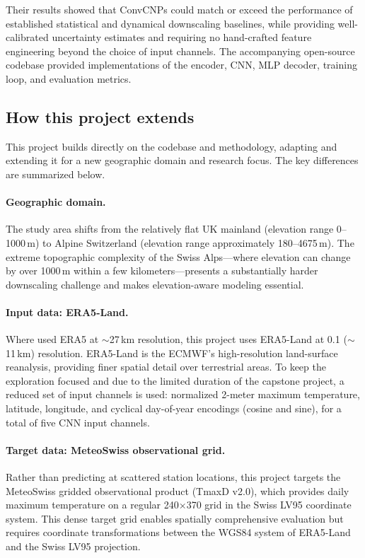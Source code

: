 Their results showed that ConvCNPs could match or exceed the performance of established statistical and dynamical downscaling baselines, while providing well-calibrated uncertainty estimates and requiring no hand-crafted feature engineering beyond the choice of input channels. The accompanying open-source codebase provided implementations of the encoder, CNN, MLP decoder, training loop, and evaluation metrics.

\subsection[How this project extends Vaughan et al. (2022)]{How this project extends \citet{vaughan2022}}

This project builds directly on the \citet{vaughan2022} codebase and methodology, adapting and extending it for a new geographic domain and research focus. The key differences are summarized below.

\paragraph{Geographic domain.} The study area shifts from the relatively flat UK mainland (elevation range 0--1000\,m) to Alpine Switzerland (elevation range approximately 180--4675\,m). The extreme topographic complexity of the Swiss Alps---where elevation can change by over 1000\,m within a few kilometers---presents a substantially harder downscaling challenge and makes elevation-aware modeling essential.

\paragraph{Input data: ERA5-Land.} Where \citet{vaughan2022} used ERA5 at $\sim$27\,km resolution, this project uses ERA5-Land at 0.1\textdegree{} ($\sim$11\,km) resolution. ERA5-Land is the ECMWF's high-resolution land-surface reanalysis, providing finer spatial detail over terrestrial areas. To keep the exploration focused and due to the limited duration of the capstone project, a reduced set of input channels is used: normalized 2-meter maximum temperature, latitude, longitude, and cyclical day-of-year encodings (cosine and sine), for a total of five CNN input channels.

\paragraph{Target data: MeteoSwiss observational grid.} Rather than predicting at scattered station locations, this project targets the MeteoSwiss gridded observational product (TmaxD v2.0), which provides daily maximum temperature on a regular 240$\times$370 grid in the Swiss LV95 coordinate system. This dense target grid enables spatially comprehensive evaluation but requires coordinate transformations between the WGS84 system of ERA5-Land and the Swiss LV95 projection.

